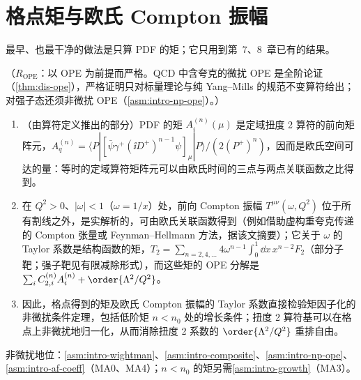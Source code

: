 \section{格点矩与欧氏 Compton 振幅}\label{sec:lattice-moments}

最早、也最干净的做法是只算 PDF 的矩；它只用到第~7、8~章已有的结果。

\begin{proposition}\label{prop:lattice-moments}
（$R_{\mathrm{OPE}}$：以 OPE 为前提而严格。QCD 中含夸克的微扰 OPE 是全阶论证（\cref{thm:dis-ope}），严格证明只对标量理论与纯 Yang--Mills 的规范不变算符给出；对强子态还须非微扰 OPE（\cref{asm:intro-np-ope}）。）
\begin{enumerate}[label=(\alph*),leftmargin=2em,itemsep=1pt,topsep=2pt]
\item （由算符定义推出的部分）PDF 的矩 $A^{(n)}_i(\mu)$ 是定域扭度 2 算符的前向矩阵元，$A^{(n)}_q=\langle P|[\bar\psi\gamma^+(\ii D^+)^{n-1}\psi]_\mu|P\rangle/(2(P^+)^n)$，因而是欧氏空间可达的量：等时的定域算符矩阵元可以由欧氏时间的三点与两点关联函数之比得到。
\item 在 $Q^2>0$、$|\omega|<1$（$\omega=1/x$）处，前向 Compton 振幅 $T^{\mu\nu}(\omega,Q^2)$ 位于所有割线之外，是实解析的，可由欧氏关联函数得到（例如借助虚构重夸克传递的 Compton 张量\cite{DetmoldLin2006}或 Feynman--Hellmann 方法\cite{ChambersEtAl2017}，据该文摘要）；它关于 $\omega$ 的 Taylor 系数是结构函数的矩，$T_2=\sum_{n=2,4,\dots}4\omega^{n-1}\int_0^1\dd x\,x^{n-2}F_2$（部分子靶；强子靶见有限减除形式），而这些矩的 OPE 分解是 $\sum_iC^{(n)}_{2,i}A^{(n)}_i+\order{\Lambda^2/Q^2}$。
\item 因此，格点得到的矩及欧氏 Compton 振幅的 Taylor 系数直接检验矩因子化的非微扰条件定理，包括低阶矩 $n<n_0$ 处的增长条件；扭度 2 算符基可以在格点上非微扰地归一化，从而消除扭度 2 系数的 $\order{\Lambda^2/Q^2}$ 重排自由。
\end{enumerate}
非微扰地位：\cref{asm:intro-wightman}、\cref{asm:intro-composite}、\cref{asm:intro-np-ope}、\cref{asm:intro-af-coeff}（MA0、MA4）；$n<n_0$ 的矩另需\cref{asm:intro-growth}（MA3）。
\end{proposition}

